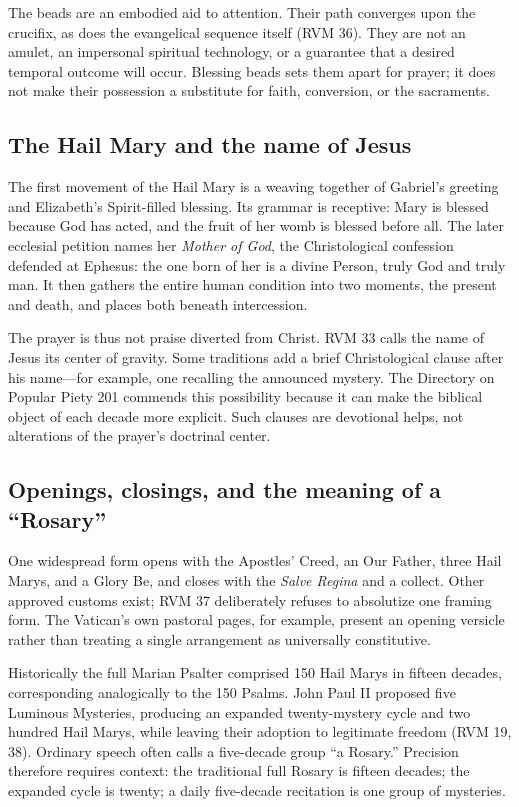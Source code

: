 The beads are an embodied aid to attention. Their path converges upon the crucifix, as does the evangelical sequence itself (RVM 36). They are not an amulet, an impersonal spiritual technology, or a guarantee that a desired temporal outcome will occur. Blessing beads sets them apart for prayer; it does not make their possession a substitute for faith, conversion, or the sacraments.

\subsection{The Hail Mary and the name of Jesus}

The first movement of the Hail Mary is a weaving together of Gabriel's greeting and Elizabeth's Spirit-filled blessing. Its grammar is receptive: Mary is blessed because God has acted, and the fruit of her womb is blessed before all. The later ecclesial petition names her \emph{Mother of God}, the Christological confession defended at Ephesus: the one born of her is a divine Person, truly God and truly man. It then gathers the entire human condition into two moments, the present and death, and places both beneath intercession.

The prayer is thus not praise diverted from Christ. RVM 33 calls the name of Jesus its center of gravity. Some traditions add a brief Christological clause after his name---for example, one recalling the announced mystery. The Directory on Popular Piety 201 commends this possibility because it can make the biblical object of each decade more explicit. Such clauses are devotional helps, not alterations of the prayer's doctrinal center.

\subsection{Openings, closings, and the meaning of a ``Rosary''}

One widespread form opens with the Apostles' Creed, an Our Father, three Hail Marys, and a Glory Be, and closes with the \emph{Salve Regina} and a collect. Other approved customs exist; RVM 37 deliberately refuses to absolutize one framing form. The Vatican's own pastoral pages, for example, present an opening versicle rather than treating a single arrangement as universally constitutive.

Historically the full Marian Psalter comprised 150 Hail Marys in fifteen decades, corresponding analogically to the 150 Psalms. John Paul II proposed five Luminous Mysteries, producing an expanded twenty-mystery cycle and two hundred Hail Marys, while leaving their adoption to legitimate freedom (RVM 19, 38). Ordinary speech often calls a five-decade group ``a Rosary.'' Precision therefore requires context: the traditional full Rosary is fifteen decades; the expanded cycle is twenty; a daily five-decade recitation is one group of mysteries.

